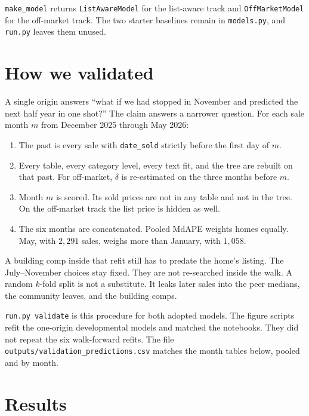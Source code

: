 \documentclass[11pt]{article}
\newcommand{\om}{off-market}
\begin{document}
\texttt{make\_model} returns \texttt{ListAwareModel} for the list-aware track and \texttt{OffMarketModel} for the off-market track. The two starter baselines remain in \texttt{models.py}, and \texttt{run.py} leaves them unused.

\FloatBarrier
\section{How we validated}
\label{sec:walk}

A single origin answers ``what if we had stopped in November and predicted the next half year in one shot?'' The claim answers a narrower question. For each sale month \(m\) from December 2025 through May 2026:

\begin{enumerate}
\item The past is every sale with \texttt{date\_sold} strictly before the first day of \(m\).
\item Every table, every category level, every text fit, and the tree are rebuilt on that past. For \om, \(\delta\) is re-estimated on the three months before \(m\).
\item Month \(m\) is scored. Its sold prices are not in any table and not in the tree. On the off-market track the list price is hidden as well.
\item The six months are concatenated. Pooled MdAPE weights homes equally. May, with \(2{,}291\) sales, weighs more than January, with \(1{,}058\).
\end{enumerate}

A building comp inside that refit still has to predate the home's listing. The July--November choices stay fixed. They are not re-searched inside the walk. A random \(k\)-fold split is not a substitute. It leaks later sales into the peer medians, the community leaves, and the building comps.

\texttt{run.py validate} is this procedure for both adopted models. The figure scripts refit the one-origin developmental models and matched the notebooks. They did not repeat the six walk-forward refits. The file \texttt{outputs/validation\_predictions.csv} matches the month tables below, pooled and by month.

\FloatBarrier
\section{Results}
\label{sec:results}
\end{document}
